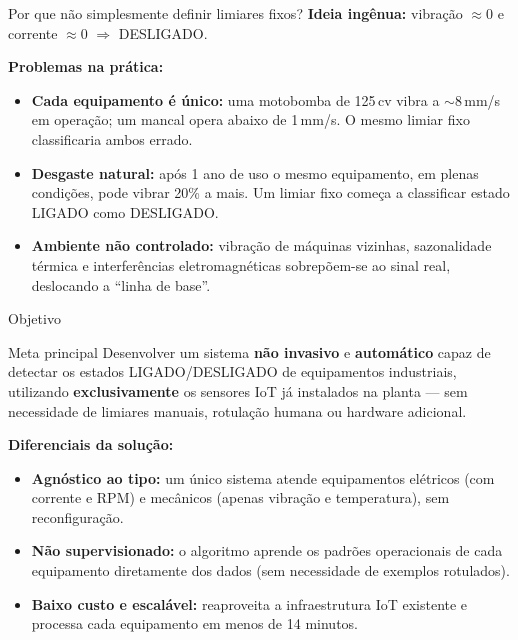 \documentclass{beamer}
\begin{document}
\begin{frame}{Por que não simplesmente definir limiares fixos?}
    \textbf{Ideia ingênua:} vibração $\approx 0$ e corrente $\approx 0$ $\Rightarrow$ DESLIGADO.

    \vspace{0.2cm}
    \textbf{Problemas na prática:}
    \begin{itemize}
        \item \textbf{Cada equipamento é único:} uma motobomba de 125\,cv vibra a $\sim$8\,mm/s em operação; um mancal opera abaixo de 1\,mm/s. O mesmo limiar fixo classificaria ambos errado.
        \item \textbf{Desgaste natural:} após 1 ano de uso o mesmo equipamento, em plenas condições, pode vibrar 20\% a mais. Um limiar fixo começa a classificar estado LIGADO como DESLIGADO.
        \item \textbf{Ambiente não controlado:} vibração de máquinas vizinhas, sazonalidade térmica e interferências eletromagnéticas sobrepõem-se ao sinal real, deslocando a ``linha de base''.
    \end{itemize}

\end{frame}

\begin{frame}{Objetivo}
    \small
    \begin{block}{Meta principal}
        Desenvolver um sistema \textbf{não invasivo} e \textbf{automático} capaz de detectar os estados LIGADO/DESLIGADO de equipamentos industriais, utilizando \textbf{exclusivamente} os sensores IoT já instalados na planta --- sem necessidade de limiares manuais, rotulação humana ou hardware adicional.
    \end{block}
    \vspace{0.2cm}
    \textbf{Diferenciais da solução:}
    \begin{itemize}
        \item \textbf{Agnóstico ao tipo:} um único sistema atende equipamentos elétricos (com corrente e RPM) e mecânicos (apenas vibração e temperatura), sem reconfiguração.
        \item \textbf{Não supervisionado:} o algoritmo aprende os padrões operacionais de cada equipamento diretamente dos dados (sem necessidade de exemplos rotulados).
        \item \textbf{Baixo custo e escalável:} reaproveita a infraestrutura IoT existente e processa cada equipamento em menos de 14 minutos.
    \end{itemize}
\end{frame}
\end{document}
